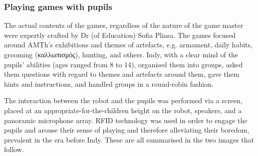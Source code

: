 \subsubsection{Playing games with pupils}

The actual contents of the games, regardless of the nature of the game master
were expertly crafted by Dr (of Education) Sofia Pliasa. The games focused
around AMTh's exhibitions and themes of artefacts, e.g. armament, daily habits,
grooming (καλλωπισμός), hunting, and others. Indy, with a clear mind of the
pupils' abilities (ages ranged from 8 to 14), organised them into groups, asked
them questions with regard to themes and artefacts around them, gave them hints
and instructions, and handled groups in a round-robin fashion.

The interaction between the robot and the pupils was performed via a screen,
placed at an appropriate-for-the-children height on the robot, speakers, and a
panoramic microphone array. RFID technology was used in order to engage the
pupils and arouse their sense of playing and therefore alleviating their
boredom, prevalent in the era before Indy. These are all summarised in the two
images that follow.


